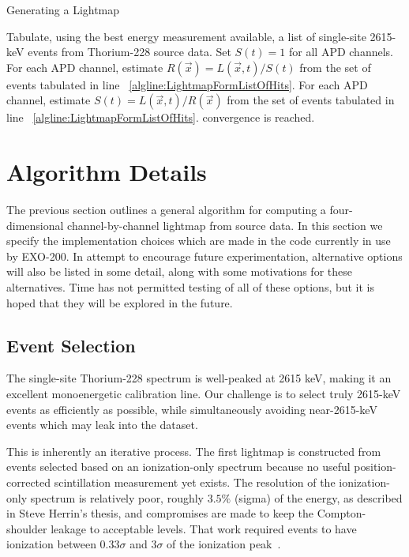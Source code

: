 \begin{algorithm}
\caption{Generating a Lightmap}
\label{alg:LightmapScheme}
\begin{algorithmic}[1]
\STATE Tabulate, using the best energy measurement available, a list of single-site 2615-keV events from Thorium-228 source data. \label{algline:LightmapFormListOfHits}
\STATE Set $S(t) = 1$ for all APD channels.
\REPEAT
  \STATE For each APD channel, estimate $R(\vec{x}) = L(\vec{x},t)/S(t)$ from the set of events tabulated in line ~\ref{algline:LightmapFormListOfHits}.
  \STATE For each APD channel, estimate $S(t) = L(\vec{x},t)/R(\vec{x})$ from the set of events tabulated in line ~\ref{algline:LightmapFormListOfHits}.
\UNTIL convergence is reached.
\end{algorithmic}
\end{algorithm}


\section{Algorithm Details}

The previous section outlines a general algorithm for computing a four-dimensional channel-by-channel lightmap from source data.  In this section we specify the implementation choices which are made in the code currently in use by EXO-200.  In attempt to encourage future experimentation, alternative options will also be listed in some detail, along with some motivations for these alternatives.  Time has not permitted testing of all of these options, but it is hoped that they will be explored in the future.

\subsection{Event Selection}\label{sec:LightmapEventSelection}

The single-site Thorium-228 spectrum is well-peaked at 2615 keV, making it an excellent monoenergetic calibration line.  Our challenge is to select truly 2615-keV events as efficiently as possible, while simultaneously avoiding near-2615-keV events which may leak into the dataset.

This is inherently an iterative process.  The first lightmap is constructed from events selected based on an ionization-only spectrum because no useful position-corrected scintillation measurement yet exists. The resolution of the ionization-only spectrum is relatively poor, roughly $3.5\%$ (sigma) of the energy, as described in Steve Herrin's thesis, and compromises are made to keep the Compton-shoulder leakage to acceptable levels.  That work required events to have ionization between $0.33\sigma$ and $3\sigma$ of the ionization peak~\cite{ThesisSteve}.

